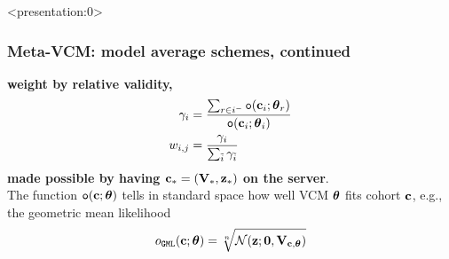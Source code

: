 \documentclass{beamer}
\newcommand{\ti}{{\tilde{i}}}                         %
\newcommand{\ef}{{\mathtt{o}}}                        %
\begin{document}
\begin{frame}<presentation:0> %
  \frametitle{Meta-VCM: model average schemes, continued} %
  \textbf{weight by relative validity,}
  \begin{align}
    \gamma_i &= \frac{\sum_{r \in i^-}{\ef( \vc_i; \vtheta_r)}}
               {\ef(\vc_i; \vtheta_i)} \\
    w_{i,j}  &= \frac{\gamma_i}{\sum_\ti \gamma_\ti}
  \end{align}
  {\color{red}\textbf{made possible by having $\mathbf{c}_*=(\mathbf{V}_*, \mathbf{z}_*)$
      on the server}}. \\
  The function $\ef(\vc;\vtheta)$ tells in standard space how well VCM
  $\boldsymbol{\theta}$ fits cohort $\mathbf{c}$, e.g., the geometric mean likelihood
  \begin{align}
    o_\mathtt{GML}(\mathbf{c}; \boldsymbol{\theta}) = \sqrt[n]{\mathcal{N}(\mathbf{z};\boldsymbol{0}, \mathbf{V}_{\mathbf{c}, \boldsymbol{\theta}})}
  \end{align}
\end{frame}
\end{document}

